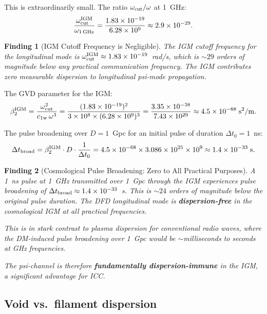 \documentclass[11pt]{article}
\newtheorem{finding}{Finding}
\newcommand{\ee}[1]{\times 10^{#1}}
\newcommand{\cfield}{c_{1\mathrm{w}}}
\begin{document}
This is extraordinarily small. The ratio $\omega_{\rm cut}/\omega$ at 1~GHz:
\begin{equation}
\frac{\omega_{\rm cut}^{\rm IGM}}{\omega_{1\,\rm GHz}} = \frac{1.83\ee{-19}}{6.28\ee{9}} \approx 2.9\ee{-29}.
\end{equation}

\begin{finding}[IGM Cutoff Frequency is Negligible]
The IGM cutoff frequency for the longitudinal mode is
$\omega_{\rm cut}^{\rm IGM} \approx 1.83\ee{-19}$~rad/s, which is
$\sim 29$ orders of magnitude below any practical communication
frequency. The IGM contributes zero measurable dispersion to
longitudinal psi-mode propagation.
\end{finding}

\noindent The GVD parameter for the IGM:
\begin{equation}
\beta_2^{\rm IGM} = \frac{\omega_{\rm cut}^2}{\cfield\,\omega^3}
= \frac{(1.83\ee{-19})^2}{3\ee{8} \times (6.28\ee{9})^3}
= \frac{3.35\ee{-38}}{7.43\ee{29}} \approx 4.5\ee{-68}\;\text{s}^2/\text{m}.
\end{equation}

The pulse broadening over $D = 1$~Gpc for an initial pulse
of duration $\Delta t_0 = 1$~ns:
\begin{equation}
\Delta t_{\rm broad} = \beta_2^{\rm IGM} \cdot D \cdot \frac{1}{\Delta t_0}
= 4.5\ee{-68} \times 3.086\ee{25} \times 10^9 \approx 1.4\ee{-33}\;\text{s}.
\end{equation}

\begin{finding}[Cosmological Pulse Broadening: Zero to All Practical Purposes]
A 1~ns pulse at 1~GHz transmitted over 1~Gpc through the IGM
experiences pulse broadening of $\Delta t_{\rm broad} \approx 1.4\ee{-33}$~s.
This is $\sim 24$ orders of magnitude below the original pulse
duration. The DFD longitudinal mode is \textbf{dispersion-free}
in the cosmological IGM at all practical frequencies.

This is in stark contrast to plasma dispersion for conventional
radio waves, where the DM-induced pulse broadening over 1~Gpc
would be $\sim$milliseconds to seconds at GHz frequencies.

The psi-channel is therefore \textbf{fundamentally dispersion-immune}
in the IGM, a significant advantage for ICC.
\end{finding}

\subsection{Void vs.\ filament dispersion}
\end{document}
